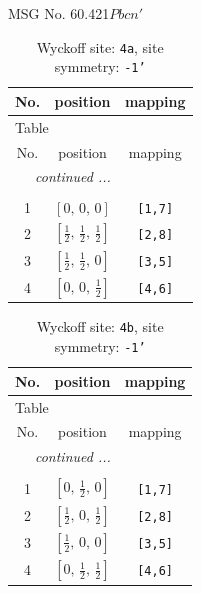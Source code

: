\documentclass[fleqn,8pt]{jsarticle}
\begin{document}
\setcounter{MaxMatrixCols}{32}

\renewcommand{\tablename}{Table~}
\renewcommand{\figurename}{Figure~}
\begin{center}
\LARGE
MSG No. 60.421\quad$Pbcn'$
\end{center}
\renewcommand{\arraystretch}{1.2}
\begin{longtable}{ccc}
\caption{Wyckoff site: {\tt 4a}, site symmetry: {\tt -1'}}
 \\
 \hline \hline
No. & position & mapping \\ \hline \endfirsthead

\multicolumn{2}{l}{\tablename\ \thetable{}} \\
 \hline \hline
No. & position & mapping \\ \hline \endhead

 \hline \hline
\multicolumn{2}{r}{\footnotesize\it continued ...} \\ \endfoot

 \hline \hline
\multicolumn{2}{r}{} \\ \endlastfoot

1 & $\left[ 0,\, 0,\, 0 \right]$ & {\tt [1,7]} \\ \hline
2 & $\left[ \frac{1}{2},\, \frac{1}{2},\, \frac{1}{2} \right]$ & {\tt [2,8]} \\ \hline
3 & $\left[ \frac{1}{2},\, \frac{1}{2},\, 0 \right]$ & {\tt [3,5]} \\ \hline
4 & $\left[ 0,\, 0,\, \frac{1}{2} \right]$ & {\tt [4,6]} \\
\end{longtable}
\renewcommand{\arraystretch}{1.2}
\begin{longtable}{ccc}
\caption{Wyckoff site: {\tt 4b}, site symmetry: {\tt -1'}}
 \\
 \hline \hline
No. & position & mapping \\ \hline \endfirsthead

\multicolumn{2}{l}{\tablename\ \thetable{}} \\
 \hline \hline
No. & position & mapping \\ \hline \endhead

 \hline \hline
\multicolumn{2}{r}{\footnotesize\it continued ...} \\ \endfoot

 \hline \hline
\multicolumn{2}{r}{} \\ \endlastfoot

1 & $\left[ 0,\, \frac{1}{2},\, 0 \right]$ & {\tt [1,7]} \\ \hline
2 & $\left[ \frac{1}{2},\, 0,\, \frac{1}{2} \right]$ & {\tt [2,8]} \\ \hline
3 & $\left[ \frac{1}{2},\, 0,\, 0 \right]$ & {\tt [3,5]} \\ \hline
4 & $\left[ 0,\, \frac{1}{2},\, \frac{1}{2} \right]$ & {\tt [4,6]} \\
\end{longtable}
\end{document}

